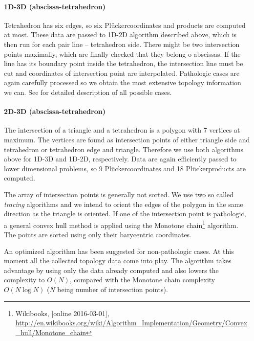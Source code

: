 \documentclass{elsarticle}
\newcommand{\plucker}{Pl\"{u}cker}
\begin{document}
\paragraph{1D-3D (abscissa-tetrahedron)}
Tetrahedron has six edges, so six \plucker coordinates and products are computed at most. These data are
passed to 1D-2D algorithm described above, which is then run for each pair line -- tetrahedron side. 
There might be two intersection points maximally, which are finally checked that they belong o abscissas.
If the line has its boundary point inside the tetrahedron, the intersection line must be cut
and coordinates of intersection point are interpolated.
Pathologic cases are again carefully processed so we obtain the most extensive topology information we can.
See \cite{fris_dp_2015} for detailed description of all possible cases.

\paragraph{2D-3D (abscissa-tetrahedron)}
The intersection of a triangle and a tetrahedron is a polygon with 7 vertices at maximum. The vertices
are found as intersection points of either triangle side and tetrahedron or tetrahedron edge and triangle.
Therefore we use both algorithms above for 1D-3D and 1D-2D, respectively. Data are again efficiently passed
to lower dimensional problems, so 9 \plucker coordinates and 18 \plucker products are computed. 

The array of intersection points is generally not sorted. We use two so called \emph{tracing} algorithms and we
intend to orient the edges of the polygon in the same direction as the triangle is oriented.
If one of the intersection point is pathologic, a general convex hull method is applied using the Monotone 
chain\footnote{Wikibooks, [online 2016-03-01], 
      \url{http://en.wikibooks.org/wiki/Algorithm_Implementation/Geometry/Convex_hull/Monotone_chain}} 
algorithm. The points are sorted using only their barycentric coordinates.

An optimized algorithm has been suggested for non-pathologic cases. At this moment all the collected topology 
data come into play. The algorithm takes advantage by using only the data already computed and also lowers
the complexity to $O(N)$, compared with the Monotone chain complexity $O(N\log N)$ 
($N$ being number of intersection points).
\end{document}
